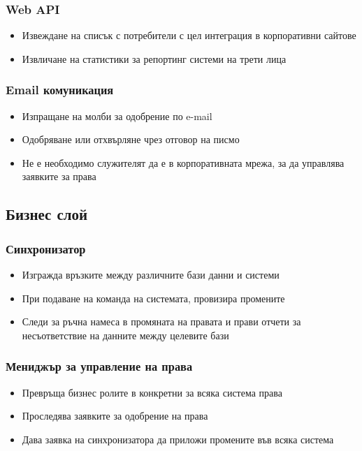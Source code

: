 \documentclass[bulgarian,a4paper,12pt,titlepage]{article}
\begin{document}
            \subsubsection{Web API}
                \begin{itemize}
                    \item Извеждане на списък с потребители с цел интеграция в корпоративни сайтове
                    \item Извличане на статистики за репортинг системи на трети лица
                \end{itemize}

            \subsubsection{Email комуникация}
                \begin{itemize}
                    \item Изпращане на молби за одобрение по e-mail
                    \item Одобряване или отхвърляне чрез отговор на писмо
                    \item Не е необходимо служителят да е в корпоративната мрежа, за да управлява заявките за права
                \end{itemize}

            
        \subsection{Бизнес слой}
            \subsubsection{Синхронизатор}
                \begin{itemize}
                    \item Изгражда връзките между различните бази данни и системи
                    \item При подаване на команда на системата, провизира промените
                    \item Следи за ръчна намеса в промяната на правата и прави отчети за несъответствие на данните между целевите бази
                \end{itemize}

            \subsubsection{Мениджър за управление на права}
                \begin{itemize}
                    \item Превръща бизнес ролите в конкретни за всяка система права
                    \item Проследява заявките за одобрение на права
                    \item Дава заявка на синхронизатора да приложи промените във всяка система
                \end{itemize}
\end{document}
